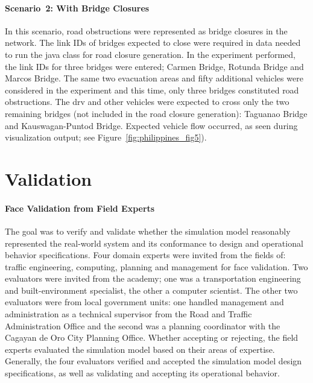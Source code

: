 \paragraph{Scenario~2: With Bridge Closures}
In this scenario, road obstructions were represented as bridge closures in the network. The link IDs of bridges expected to close were required in data needed to run the java class for road closure generation. In the experiment performed, the link IDs for three bridges were entered; Carmen Bridge, Rotunda Bridge and Marcos Bridge. The same two evacuation areas and fifty additional vehicles were considered in the experiment and this time, only three bridges constituted road obstructions. The \gls{drv} and other vehicles were expected to cross only the two remaining bridges (not included in the road closure generation): Taguanao Bridge and Kauswagan-Puntod Bridge. Expected vehicle flow occurred, as seen during visualization output; see Figure~\ref{fig:philippines_fig5}). 

\section{Validation} 
\paragraph{Face Validation from Field Experts}
The goal was to verify and validate whether the simulation model reasonably represented the real-world system and its conformance to design and operational behavior specifications. Four domain experts were invited from the fields of: traffic engineering, computing, planning and management for face validation. Two evaluators were invited from the academy; one was a transportation engineering and built-environment specialist,  the other a computer scientist. The other two evaluators were from  local government units: one handled management and administration as a technical supervisor from the Road and Traffic Administration Office and the second was a planning coordinator with the Cagayan de Oro City Planning Office. Whether accepting or rejecting, the field experts evaluated the simulation model based on their areas of expertise. Generally, the four evaluators verified and accepted the simulation model design specifications, as well as validating and accepting its operational behavior.

